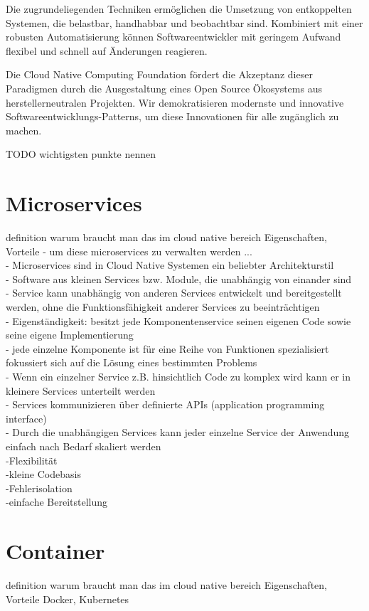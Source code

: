Die zugrundeliegenden Techniken ermöglichen die Umsetzung von entkoppelten Systemen, die belastbar, handhabbar und beobachtbar sind. Kombiniert mit einer robusten Automatisierung können Softwareentwickler mit geringem Aufwand flexibel und schnell auf Änderungen reagieren.

Die Cloud Native Computing Foundation fördert die Akzeptanz dieser Paradigmen durch die Ausgestaltung eines Open Source Ökosystems aus herstellerneutralen Projekten. Wir demokratisieren modernste und innovative Softwareentwicklungs-Patterns, um diese Innovationen für alle zugänglich zu machen.

TODO wichtigsten punkte nennen


\section{Microservices}
definition
warum braucht man das im cloud native bereich
Eigenschaften, Vorteile
- um diese microservices zu verwalten werden ...\\

- Microservices sind in Cloud Native Systemen ein beliebter Architekturstil \\
- Software aus kleinen Services bzw. Module, die unabhängig von einander sind\\
- Service kann unabhängig von anderen Services entwickelt und bereitgestellt	    werden, ohne die Funktionsfähigkeit anderer Services zu beeinträchtigen\\
- Eigenständigkeit: besitzt jede Komponentenservice seinen eigenen Code sowie seine eigene Implementierung\\
- jede einzelne Komponente ist für eine Reihe von Funktionen spezialisiert fokussiert sich auf die Lösung eines bestimmten Problems\\
- Wenn ein einzelner Service z.B. hinsichtlich Code zu komplex wird kann er in kleinere Services unterteilt werden\\
- Services kommunizieren über definierte APIs (application programming interface)\\
- Durch die unabhängigen Services kann jeder einzelne Service der Anwendung einfach nach Bedarf skaliert werden\\

-Flexibilität\\
-kleine Codebasis\\
-Fehlerisolation\\
-einfache Bereitstellung\\
\section{Container}
definition
warum braucht man das im cloud native bereich
Eigenschaften, Vorteile
 Docker, Kubernetes\\

